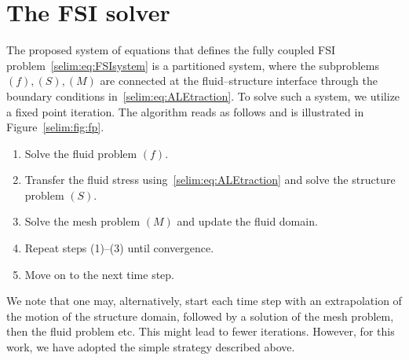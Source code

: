 \section{The FSI solver}
\label{selim:sec:primalsolver}

The proposed system of equations that defines the fully coupled FSI
problem~\eqref{selim:eq:FSIsystem} is a partitioned system, where the
subproblems $(f),(S),(M)$ are connected at the fluid--structure interface
through the boundary conditions in~\eqref{selim:eq:ALEtraction}. To
solve such a system, we utilize a fixed point iteration. The algorithm
reads as follows and is illustrated in Figure~\ref{selim:fig:fp}.
\begin{enumerate}
  \item Solve the fluid problem $(f)$.

  \item Transfer the fluid stress using~\eqref{selim:eq:ALEtraction}
  and solve the structure problem $(S)$.

  \item Solve the mesh problem $(M)$ and update the fluid domain.

  \item Repeat steps (1)--(3) until convergence.

  \item Move on to the next time step.
\end{enumerate}
We note that one may, alternatively, start each time step with an
extrapolation of the motion of the structure domain, followed by a
solution of the mesh problem, then the fluid problem etc. This might
lead to fewer iterations. However, for this work, we have adopted the
simple strategy described above.

